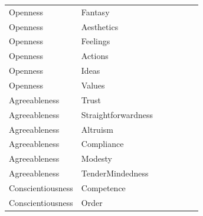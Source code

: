 \documentclass{article}\usepackage[]{graphicx}\usepackage[]{color}
\begin{document}
\begin{table}
\begin{tabular}[t]{lllllll}
Openness & Fantasy & \cellcolor{white}{0.32} & \cellcolor{white}{0.03} & \cellcolor{white}{-0.15} & \cellcolor{white}{0.1} & \cellcolor{yellow}{0.63}\\
Openness & Aesthetics & \cellcolor{white}{0.01} & \cellcolor{white}{0.21} & \cellcolor{white}{0.02} & \cellcolor{white}{0.14} & \cellcolor{yellow}{0.69}\\
Openness & Feelings & \cellcolor{yellow}{0.53} & \cellcolor{white}{0.3} & \cellcolor{white}{0.2} & \cellcolor{white}{0} & \cellcolor{white}{0.43}\\
\addlinespace
Openness & Actions & \cellcolor{white}{0.36} & \cellcolor{white}{-0.07} & \cellcolor{white}{-0.2} & \cellcolor{white}{0.19} & \cellcolor{yellow}{0.53}\\
Openness & Ideas & \cellcolor{white}{0.04} & \cellcolor{white}{-0.13} & \cellcolor{white}{0.19} & \cellcolor{white}{-0.05} & \cellcolor{yellow}{0.67}\\
Openness & Values & \cellcolor{white}{0.22} & \cellcolor{white}{0.19} & \cellcolor{white}{0} & \cellcolor{white}{0.17} & \cellcolor{yellow}{0.6}\\
Agreeableness & Trust & \cellcolor{white}{0.39} & \cellcolor{white}{-0.02} & \cellcolor{white}{0.15} & \cellcolor{yellow}{0.53} & \cellcolor{white}{0.14}\\
Agreeableness & Straightforwardness & \cellcolor{white}{0.03} & \cellcolor{white}{0.22} & \cellcolor{white}{0.32} & \cellcolor{yellow}{0.55} & \cellcolor{white}{0}\\
\addlinespace
Agreeableness & Altruism & \cellcolor{yellow}{0.53} & \cellcolor{white}{0.13} & \cellcolor{white}{0.3} & \cellcolor{yellow}{0.54} & \cellcolor{white}{0.16}\\
Agreeableness & Compliance & \cellcolor{white}{0.01} & \cellcolor{white}{0.07} & \cellcolor{white}{0.07} & \cellcolor{yellow}{0.78} & \cellcolor{white}{0.21}\\
Agreeableness & Modesty & \cellcolor{white}{0.03} & \cellcolor{white}{0.44} & \cellcolor{white}{0.16} & \cellcolor{white}{0.41} & \cellcolor{white}{0.07}\\
Agreeableness & TenderMindedness & \cellcolor{white}{0.31} & \cellcolor{white}{0.3} & \cellcolor{white}{0.08} & \cellcolor{white}{0.36} & \cellcolor{white}{0.36}\\
Conscientiousness & Competence & \cellcolor{white}{0.27} & \cellcolor{white}{-0.24} & \cellcolor{yellow}{0.74} & \cellcolor{white}{0.06} & \cellcolor{white}{0.12}\\
\addlinespace
Conscientiousness & Order & \cellcolor{white}{0.02} & \cellcolor{white}{0.1} & \cellcolor{yellow}{0.69} & \cellcolor{white}{0.09} & \cellcolor{white}{-0.11}\\

\end{tabular}
\end{table}
\end{document}

